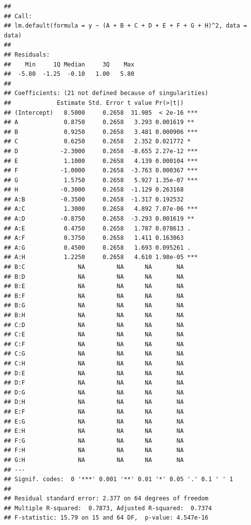 \documentclass[]{article}
\begin{document}
\begin{verbatim}
## 
## Call:
## lm.default(formula = y ~ (A + B + C + D + E + F + G + H)^2, data = data)
## 
## Residuals:
##    Min     1Q Median     3Q    Max 
##  -5.80  -1.25  -0.10   1.00   5.80 
## 
## Coefficients: (21 not defined because of singularities)
##             Estimate Std. Error t value Pr(>|t|)    
## (Intercept)   8.5000     0.2658  31.985  < 2e-16 ***
## A             0.8750     0.2658   3.293 0.001619 ** 
## B             0.9250     0.2658   3.481 0.000906 ***
## C             0.6250     0.2658   2.352 0.021772 *  
## D            -2.3000     0.2658  -8.655 2.27e-12 ***
## E             1.1000     0.2658   4.139 0.000104 ***
## F            -1.0000     0.2658  -3.763 0.000367 ***
## G             1.5750     0.2658   5.927 1.35e-07 ***
## H            -0.3000     0.2658  -1.129 0.263168    
## A:B          -0.3500     0.2658  -1.317 0.192532    
## A:C           1.3000     0.2658   4.892 7.07e-06 ***
## A:D          -0.8750     0.2658  -3.293 0.001619 ** 
## A:E           0.4750     0.2658   1.787 0.078613 .  
## A:F           0.3750     0.2658   1.411 0.163063    
## A:G           0.4500     0.2658   1.693 0.095261 .  
## A:H           1.2250     0.2658   4.610 1.98e-05 ***
## B:C               NA         NA      NA       NA    
## B:D               NA         NA      NA       NA    
## B:E               NA         NA      NA       NA    
## B:F               NA         NA      NA       NA    
## B:G               NA         NA      NA       NA    
## B:H               NA         NA      NA       NA    
## C:D               NA         NA      NA       NA    
## C:E               NA         NA      NA       NA    
## C:F               NA         NA      NA       NA    
## C:G               NA         NA      NA       NA    
## C:H               NA         NA      NA       NA    
## D:E               NA         NA      NA       NA    
## D:F               NA         NA      NA       NA    
## D:G               NA         NA      NA       NA    
## D:H               NA         NA      NA       NA    
## E:F               NA         NA      NA       NA    
## E:G               NA         NA      NA       NA    
## E:H               NA         NA      NA       NA    
## F:G               NA         NA      NA       NA    
## F:H               NA         NA      NA       NA    
## G:H               NA         NA      NA       NA    
## ---
## Signif. codes:  0 '***' 0.001 '**' 0.01 '*' 0.05 '.' 0.1 ' ' 1
## 
## Residual standard error: 2.377 on 64 degrees of freedom
## Multiple R-squared:  0.7873, Adjusted R-squared:  0.7374 
## F-statistic: 15.79 on 15 and 64 DF,  p-value: 4.547e-16
\end{verbatim}
\end{document}

